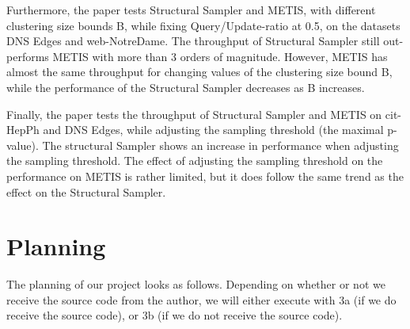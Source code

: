 \documentclass[a4paper]{article}
\begin{document}
Furthermore, the paper tests Structural Sampler and METIS, with different clustering size bounds B, while fixing Query/Update-ratio at 0.5, on the datasets DNS Edges and web-NotreDame. The throughput of Structural Sampler still out-performs METIS with more than 3 orders of magnitude. However, METIS has almost the same throughput for changing values of the clustering size bound B, while the performance of the Structural Sampler decreases as B increases. 

Finally, the paper tests the throughput of Structural Sampler and METIS on cit-HepPh and DNS Edges, while adjusting the sampling threshold (the maximal p-value). The structural Sampler shows an increase in performance when adjusting the sampling threshold. The effect of adjusting the sampling threshold on the performance on METIS is rather limited, but it does follow the same trend as the effect on the Structural Sampler.

\pagebreak
\section{Planning}\label{sec:Pl}
The planning of our project looks as follows. Depending on whether or not we receive the source code from the author, we will either execute with 3a (if we do receive the source code), or 3b (if we do not receive the source code).
\end{document}
